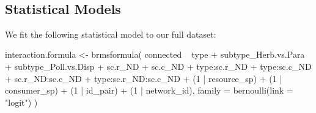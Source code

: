 \documentclass[11pt,]{article}
\newenvironment{Shaded}{}{}
\newcommand{\KeywordTok}[1]{\textcolor[rgb]{0.00,0.00,1.00}{#1}}
\newcommand{\DataTypeTok}[1]{#1}
\newcommand{\DecValTok}[1]{#1}
\newcommand{\StringTok}[1]{\textcolor[rgb]{0.00,0.50,0.50}{#1}}
\newcommand{\OperatorTok}[1]{#1}
\newcommand{\NormalTok}[1]{#1}
\begin{document}
\begin{Shaded}
\end{Shaded}

~

\subsection{Statistical Models}\label{statistical-models}

We fit the following statistical model to our full dataset:

\begin{Shaded}
\begin{Highlighting}[]
\NormalTok{interaction.formula <-}\StringTok{ }\KeywordTok{brmsformula}\NormalTok{(}
\NormalTok{  connected }\OperatorTok{~}\StringTok{ }\NormalTok{type }\OperatorTok{+}\StringTok{ }\NormalTok{subtype_Herb.vs.Para }\OperatorTok{+}\StringTok{ }\NormalTok{subtype_Poll.vs.Disp }\OperatorTok{+}\StringTok{ }\NormalTok{sc.r_ND }\OperatorTok{+}\StringTok{ }\NormalTok{sc.c_ND }\OperatorTok{+}\StringTok{ }
\StringTok{    }\NormalTok{type}\OperatorTok{:}\NormalTok{sc.r_ND }\OperatorTok{+}\StringTok{ }\NormalTok{type}\OperatorTok{:}\NormalTok{sc.c_ND }\OperatorTok{+}\StringTok{ }\NormalTok{sc.r_ND}\OperatorTok{:}\NormalTok{sc.c_ND }\OperatorTok{+}
\StringTok{    }\NormalTok{type}\OperatorTok{:}\NormalTok{sc.r_ND}\OperatorTok{:}\NormalTok{sc.c_ND }\OperatorTok{+}
\StringTok{    }\NormalTok{(}\DecValTok{1} \OperatorTok{|}\StringTok{ }\NormalTok{resource_sp) }\OperatorTok{+}\StringTok{ }\NormalTok{(}\DecValTok{1} \OperatorTok{|}\StringTok{ }\NormalTok{consumer_sp) }\OperatorTok{+}\StringTok{ }\NormalTok{(}\DecValTok{1} \OperatorTok{|}\StringTok{ }\NormalTok{id_pair) }\OperatorTok{+}\StringTok{ }\NormalTok{(}\DecValTok{1} \OperatorTok{|}\StringTok{ }\NormalTok{network_id),}
  \DataTypeTok{family =} \KeywordTok{bernoulli}\NormalTok{(}\DataTypeTok{link =} \StringTok{"logit"}\NormalTok{)}
\NormalTok{)}
\end{Highlighting}
\end{Shaded}
\end{document}
